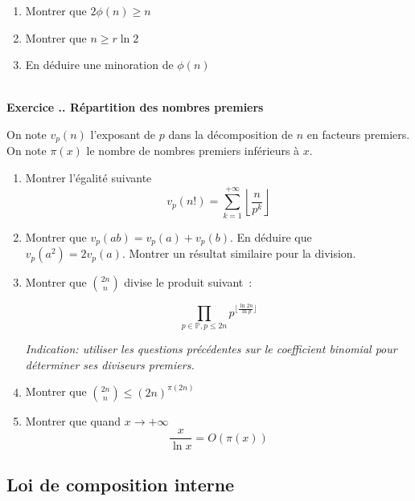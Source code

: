\documentclass{article}
\newcommand{\mb}[1]{\mathbb{#1}}
\newcounter{exo}
\newcommand{\exercice}[1][\null]{\textbf{\\ Exercice \thesection.\theexo. #1} \addtocounter{exo}{1}}
\begin{document}
\begin{enumerate}
    \item Montrer que $2 \phi(n) \geq n$
    \item Montrer que $n \geq r \ln 2$
    \item En déduire une minoration de $\phi(n)$
\end{enumerate}



\exercice[Répartition des nombres premiers]

On note $v_p(n)$ l'exposant de $p$ dans la décomposition de $n$ 
en facteurs premiers. On note $\pi(x)$ le nombre de nombres premiers 
inférieurs à $x$.

\begin{enumerate}
    \item Montrer l'égalité suivante
        \begin{equation*}
            v_p (n!) = \sum_{k = 1}^{+\infty} \left\lfloor \frac{n}{p^k} \right\rfloor
        \end{equation*}

    \item Montrer que $v_p (a b) = v_p (a) + v_p (b)$. En déduire que $v_p (a^2)
        = 2 v_p (a)$. Montrer un résultat similaire pour la division.

    \item Montrer que ${ 2n \choose n }$ divise le produit suivant~:

            \begin{equation*}
                \prod_{p \in \mb{P}, p \leq 2n} p^{ \lfloor \frac{\ln 2n}{\ln p}
                \rfloor}
            \end{equation*}

            \emph{Indication: utiliser les questions précédentes sur le coefficient
            binomial pour déterminer ses diviseurs premiers.}

    \item Montrer que ${ 2n \choose n } \leq (2n)^{\pi (2n)}$


    \item Montrer que quand $x \to +\infty$
        \begin{equation*}
            \frac{x}{\ln x} = O (\pi (x)) 
        \end{equation*}
\end{enumerate}


\subsection{Loi de composition interne}
\end{document}
